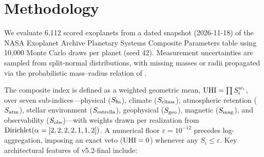 \documentclass[linenumbers]{aastex702}
\begin{document}
\section{Methodology}

We evaluate 6,112 scored exoplanets from a dated snapshot (2026-11-18) of the NASA Exoplanet Archive Planetary Systems Composite Parameters table \citep[\texttt{pscomppars}; 6,470 rows, 358 excluded for missing core parameters;][]{Akeson2013} using 10,000 Monte Carlo draws per planet (seed 42). Measurement uncertainties are sampled from split-normal distributions, with missing masses or radii propagated via the probabilistic mass--radius relation of \citet{Chen2017}.

The composite index is defined as a weighted geometric mean, ${\rm UHI} = \prod S_i^{w_i}$, over seven sub-indices---physical ($S_{\rm fis}$), climate ($S_{\rm clima}$), atmospheric retention ($S_{\rm atm}$), stellar environment ($S_{\rm estrella}$), geophysical ($S_{\rm geo}$), magnetic ($S_{\rm mag}$), and observability ($S_{\rm obs}$)---with weights drawn per realization from ${\rm Dirichlet}(\alpha = [2, 2, 2, 2, 1, 1, 2])$. A numerical floor $\varepsilon = 10^{-12}$ precedes log-aggregation, imposing an exact veto (${\rm UHI} = 0$) whenever any $S_i \leq \varepsilon$. Key architectural features of v5.2-final include:
\end{document}
